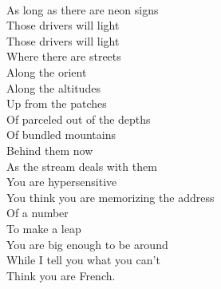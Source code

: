 \documentclass[smalldemyvopaper,11pt,twoside,onecolumn,openright,extrafontsizes]{memoir}
\begin{document}
\\As long as there are neon signs
\\Those drivers will light
\\Those drivers will light
\\Where there are streets
\\Along the orient
\\Along the altitudes
\\Up from the patches
\\Of parceled out of the depths
\\Of bundled mountains
\\Behind them now
\\As the stream deals with them
\\You are hypersensitive
\\You think you are memorizing the address
\\Of a number
\\To make a leap
\\You are big enough to be around
\\While I tell you what you can't
\\Think you are French.
\end{document}
